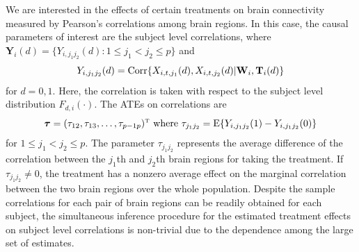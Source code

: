 \documentclass[12pt]{article}
\def\be{\begin{equation}}
\def\ee{\end{equation}}
\def\T{{ \mathrm{\scriptscriptstyle T} }}
\theoremstyle{definition}
\newcommand{\E}{\rm E}
\newcommand{\cor}{{\rm Corr}}
\newcommand{\bT}{{\mathbf T}}
\newcommand{\bW}{{\mathbf W}}
\newcommand{\bY}{{\mathbf Y}}
\newcommand{\btau}{\boldsymbol{\tau}}
\begin{document}
We are interested in 
the effects of certain treatments on brain connectivity measured by Pearson's correlations among brain regions. 
In this case, the causal parameters of interest are the subject level correlations, where $\bY_{i}(d) = \{Y_{i, j_1j_2}(d): 1 \leq j_1 < j_2 \leq p\}$ and
\be
Y_{i, j_1j_2}(d) = {\cor}\{X_{i, t, j_1}(d), X_{i, t, j_2}(d) | \bW_i, \bT_i(d) \}
\label{eq:Corr}\ee 
for $d = 0, 1$.
Here, the correlation is taken with respect to the subject level distribution $F_{d, i}(\cdot)$.
The ATEs on correlations are
\be
\btau = (\tau_{12}, \tau_{13}, \ldots, \tau_{p-1 p})^{\T} \ \mbox{where} \ 
\tau_{j_1j_2} = {\E}\{Y_{i, j_1j_2}(1) - Y_{i, j_1j_2}(0)\}
\label{eq:ATE}
\ee
for $1 \leq j_1 < j_2 \leq p$. 
The parameter $\tau_{j_1j_2}$ represents the average difference of the correlation between the $j_1$th and $j_2$th brain regions for taking the treatment. If $\tau_{j_1j_2} \neq 0$, the treatment has a nonzero average effect on the marginal correlation between the two brain regions over the whole population. 
Despite the sample correlations for each pair of brain regions can be readily obtained for each subject, the simultaneous inference procedure for the estimated treatment effects on subject level correlations is non-trivial due to the dependence among the large set of estimates.
\end{document}
